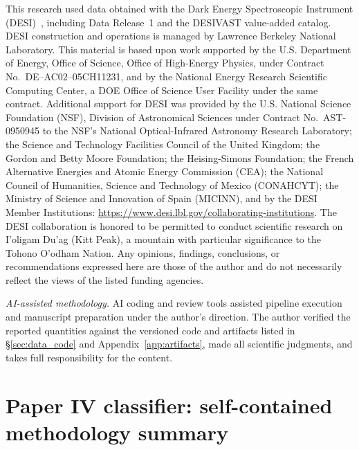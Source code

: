 \documentclass[twocolumn,linenumbers]{aastex702}
\begin{document}
\fi
\begin{acknowledgments}
This research used data obtained with the Dark Energy Spectroscopic
Instrument (DESI)~\cite{DESI2025DR1}, including Data Release~1 and the
DESIVAST value-added catalog. DESI construction and operations is managed
by Lawrence Berkeley National Laboratory. This material is based upon
work supported by the U.S. Department of Energy, Office of Science,
Office of High-Energy Physics, under Contract No.~DE--AC02--05CH11231,
and by the National Energy Research Scientific Computing Center, a DOE
Office of Science User Facility under the same contract. Additional
support for DESI was provided by the U.S. National Science Foundation
(NSF), Division of Astronomical Sciences under Contract No.~AST-0950945
to the NSF's National Optical-Infrared Astronomy Research Laboratory;
the Science and Technology Facilities Council of the United Kingdom;
the Gordon and Betty Moore Foundation; the Heising-Simons Foundation;
the French Alternative Energies and Atomic Energy Commission (CEA); the
National Council of Humanities, Science and Technology of Mexico
(CONAHCYT); the Ministry of Science and Innovation of Spain (MICINN),
and by the DESI Member Institutions:
\url{https://www.desi.lbl.gov/collaborating-institutions}. The DESI
collaboration is honored to be permitted to conduct scientific research
on I'oligam Du'ag (Kitt Peak), a mountain with particular significance
to the Tohono O'odham Nation. Any opinions, findings, conclusions, or
recommendations expressed here are those of the author and do not
necessarily reflect the views of the listed funding agencies.

\textit{AI-assisted methodology.} AI coding and review tools assisted
pipeline execution and manuscript preparation under the author's
direction. The author verified the reported quantities against the
versioned code and artifacts listed in \S\ref{sec:data_code} and
Appendix~\ref{app:artifacts}, made all scientific judgments, and takes
full responsibility for the content.
\end{acknowledgments}

\appendix
\section{Paper IV classifier: self-contained methodology summary}\label{app:paper4_methods}
\end{document}
